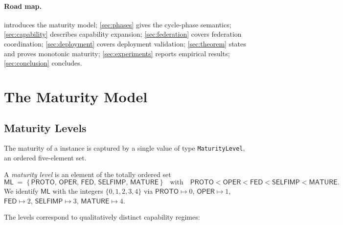 \documentclass[11pt]{article}
\newcommand{\ML}{\mathsf{ML}}               %
\newcommand{\Proto}{\ensuremath{\mathsf{PROTO}}}
\newcommand{\Oper}{\ensuremath{\mathsf{OPER}}}
\newcommand{\Fed}{\ensuremath{\mathsf{FED}}}
\newcommand{\SelfImp}{\ensuremath{\mathsf{SELFIMP}}}
\newcommand{\Matur}{\ensuremath{\mathsf{MATURE}}}
\begin{document}
\paragraph{Road map.}
 introduces the maturity model;
\cref{sec:phases} gives the cycle-phase semantics;
\cref{sec:capability} describes capability expansion;
\cref{sec:federation} covers federation coordination;
\cref{sec:deployment} covers deployment validation;
\cref{sec:theorem} states and proves monotonic maturity;
\cref{sec:experiments} reports empirical results;
\cref{sec:conclusion} concludes.

\section{The Maturity Model}\label{sec:maturity}

\subsection{Maturity Levels}

The maturity of a \JuGeo{} instance is captured by a single value of
type \texttt{MaturityLevel}, an ordered five-element set.

\begin{definition}\label{def:ml}
A \emph{maturity level} is an element of the totally ordered set
\[
  \ML \;=\; \{\,\Proto,\,\Oper,\,\Fed,\,\SelfImp,\,\Matur\,\}
  \quad\text{with}\quad
  \Proto < \Oper < \Fed < \SelfImp < \Matur.
\]
We identify $\ML$ with the integers $\{0,1,2,3,4\}$ via
$\Proto \mapsto 0$, $\Oper \mapsto 1$, $\Fed \mapsto 2$,
$\SelfImp \mapsto 3$, $\Matur \mapsto 4$.
\end{definition}

The levels correspond to qualitatively distinct capability regimes:
\end{document}

